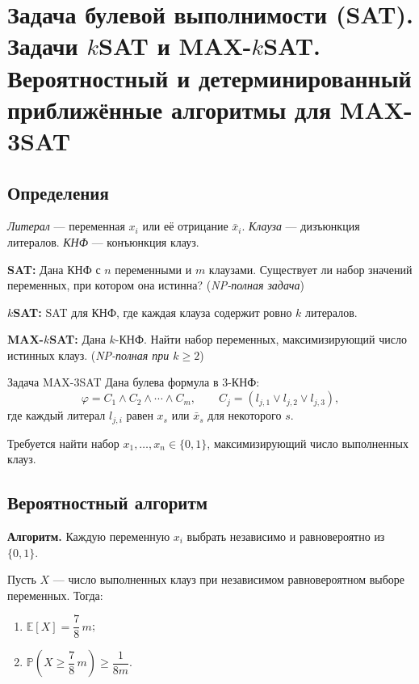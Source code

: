 
\section{Задача булевой выполнимости (SAT). Задачи $k$SAT и MAX-$k$SAT. Вероятностный и детерминированный приближённые алгоритмы для MAX-3SAT}

\subsection{Определения}

\begin{Definition}{}{}
	\emph{Литерал} --- переменная $x_i$ или её отрицание $\bar{x}_i$.
	\emph{Клауза} --- дизъюнкция литералов.
	\emph{КНФ} --- конъюнкция клауз.
	
	\textbf{SAT:} Дана КНФ с $n$ переменными и $m$ клаузами. Существует ли набор значений переменных, при котором она истинна? (\emph{NP-полная задача})
	
	\textbf{$k$SAT:} SAT для КНФ, где каждая клауза содержит ровно $k$ литералов.
	
	\textbf{MAX-$k$SAT:} Дана $k$-КНФ. Найти набор переменных, максимизирующий число истинных клауз. (\emph{NP-полная при $k \geq 2$})
\end{Definition}

\begin{Definition}{Задача MAX-3SAT}{}
	Дана булева формула в 3-КНФ:
	\[
	\varphi = C_1 \wedge C_2 \wedge \cdots \wedge C_m,
	\qquad
	C_j = (l_{j,1} \vee l_{j,2} \vee l_{j,3}),
	\]
	где каждый литерал $l_{j,i}$ равен $x_s$ или $\bar{x}_s$ для некоторого $s$.
	
	Требуется найти набор $x_1, \ldots, x_n \in \{0,1\}$, максимизирующий число выполненных клауз.
\end{Definition}

\subsection{Вероятностный алгоритм}

\textbf{Алгоритм.} Каждую переменную $x_i$ выбрать независимо и равновероятно из $\{0,1\}$.

\begin{Lemma}{}{}
	Пусть $X$ --- число выполненных клауз при независимом равновероятном выборе переменных. Тогда:
	\begin{enumerate}
		\item $\mathbb{E}[X] = \dfrac{7}{8}\,m$;
		\item $\mathbb{P}\!\left(X \geq \dfrac{7}{8}\,m\right) \geq \dfrac{1}{8m}$.
	\end{enumerate}
\end{Lemma}

